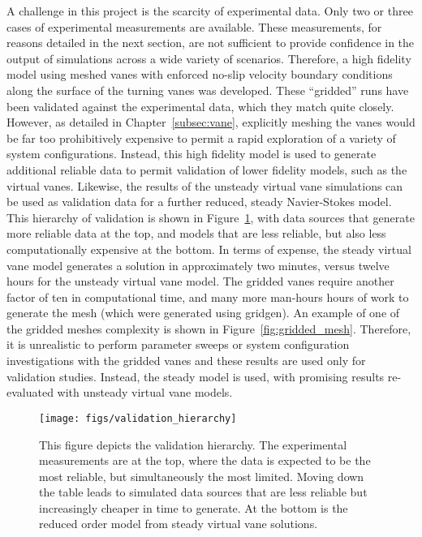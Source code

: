 A challenge in this project is the scarcity of experimental data. Only
two or three cases of experimental measurements are available. These
measurements, for reasons detailed in the next section, are not
sufficient to provide confidence in the output of simulations across a
wide variety  of scenarios. Therefore, a high fidelity model using 
meshed vanes with enforced no-slip velocity boundary conditions along
the surface of the turning vanes was developed. These ``gridded'' runs have
been validated against the experimental data, which they match quite
closely. However, as detailed in Chapter~\ref{subsec:vane}, 
explicitly meshing the vanes would be far too 
prohibitively expensive to permit a rapid exploration of a variety of
system configurations. Instead, this high fidelity model is used 
to generate additional reliable data to permit validation of lower
fidelity models, such as the virtual vanes. Likewise, the results of the
unsteady virtual vane simulations can be used as validation data for a
further reduced, steady Navier-Stokes model. This hierarchy of
validation is shown in Figure~\ref{fig:val_hier}, with data sources that
generate more reliable data at the top, and models that are less
reliable, but also less computationally expensive at the bottom. In
terms of expense, the steady virtual vane model generates a solution in
approximately two minutes, versus twelve hours for the unsteady virtual
vane model. The gridded vanes require another factor of ten in
computational time, and many more man-hours hours of work to generate
the mesh (which were generated using gridgen). An example of one of the
gridded meshes complexity is shown in Figure~\ref{fig:gridded_mesh}. 
Therefore, it is unrealistic to perform parameter sweeps or
system configuration investigations with the gridded vanes and these
results are used only for validation studies. Instead, the
steady model is used, with promising results re-evaluated with unsteady
virtual vane models. %

%
%
 \begin{figure}[!htb]
   \begin{center}
    \texttt{[image: figs/validation\_hierarchy]}
    \caption{This figure depicts the validation hierarchy. The
    experimental measurements are at the top, where the data is expected
    to be the most reliable, but simultaneously the most
    limited. Moving down the table leads to simulated data sources that
    are less reliable but increasingly cheaper in time to generate. At
    the bottom is the reduced order model from steady virtual vane solutions.} 
    \label{fig:val_hier}
   \end{center}
 \end{figure}

